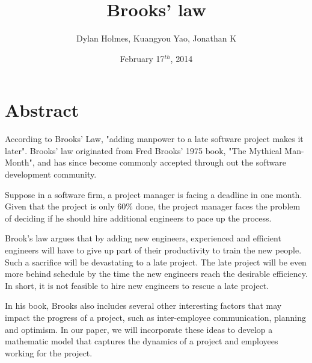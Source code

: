 \documentclass{article}
\author{Dylan Holmes, Kuangyou Yao, Jonathan K}
\title{Brooks' law}
\date{February 17$^{th}$, 2014}
\begin{document}
\maketitle

\section*{Abstract}
According to Brooks' Law, "adding manpower to a late software project makes it later". Brooks' law originated from Fred Brooks' 1975 book, "The Mythical Man-Month", and has since become commonly accepted through out the software development community. 

Suppose in a software firm, a project manager is facing a deadline in one month. Given that the project is only 60\% done, the project manager faces the problem of deciding if he should hire additional engineers to pace up the process.

Brook’s law argues that by adding new engineers, experienced and efficient engineers will have to give up part of their productivity to train the new people. Such a sacrifice will be devastating to a late project. The late project will be even more behind schedule by the time the new engineers reach the desirable efficiency. In short, it is not feasible to hire new engineers to rescue a late project.

In his book, Brooks also includes several other interesting factors that may impact the progress of a project, such as inter-employee communication, planning and optimism. In our paper, we will incorporate these ideas to develop a mathematic model that captures the dynamics of a project and employees working for the project.
\end{document}
